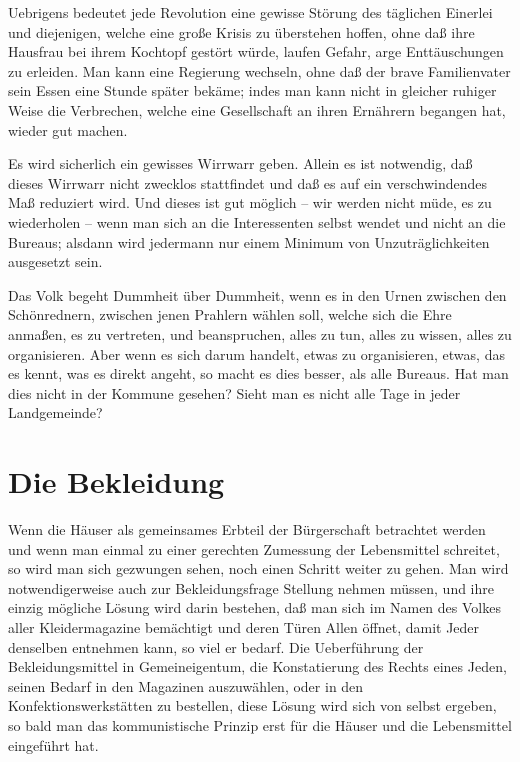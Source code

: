 \documentclass{scrbook}
\begin{document}
Uebrigens bedeutet jede Revolution eine gewisse Störung des täglichen Einerlei und diejenigen, welche eine große Krisis zu überstehen hoffen, ohne daß ihre Hausfrau bei ihrem Kochtopf gestört würde, laufen Gefahr, arge Enttäuschungen zu erleiden. Man kann eine Regierung wechseln, ohne daß der brave Familienvater sein Essen eine Stunde später bekäme; indes man kann nicht in gleicher ruhiger Weise die Verbrechen, welche eine Gesellschaft an ihren Ernährern begangen hat, wieder gut machen.

Es wird sicherlich ein gewisses Wirrwarr geben. Allein es ist notwendig, daß dieses Wirrwarr nicht zwecklos stattfindet und daß es auf ein verschwindendes Maß reduziert wird. Und dieses ist gut möglich – wir werden nicht müde, es zu wiederholen – wenn man sich an die Interessenten selbst wendet und nicht an die Bureaus; alsdann wird jedermann nur einem Minimum von Unzuträglichkeiten ausgesetzt sein.

Das Volk begeht Dummheit über Dummheit, wenn es in den Urnen zwischen den Schönrednern, zwischen jenen Prahlern wählen soll, welche sich die Ehre anmaßen, es zu vertreten, und beanspruchen, alles zu tun, alles zu wissen, alles zu organisieren. Aber wenn es sich darum handelt, etwas zu organisieren, etwas, das es kennt, was es direkt angeht, so macht es dies besser, als alle Bureaus. Hat man dies nicht in der Kommune gesehen? Sieht man es nicht alle Tage in jeder Landgemeinde?

\chapter{Die Bekleidung}

Wenn die Häuser als gemeinsames Erbteil der Bürgerschaft betrachtet werden und wenn man einmal zu einer gerechten Zumessung der Lebensmittel schreitet, so wird man sich gezwungen sehen, noch einen Schritt weiter zu gehen. Man wird notwendigerweise auch zur Bekleidungsfrage Stellung nehmen müssen, und ihre einzig mögliche Lösung wird darin bestehen, daß man sich im Namen des Volkes aller Kleidermagazine bemächtigt und deren Türen Allen öffnet, damit Jeder denselben entnehmen kann, so viel er bedarf. Die Ueberführung der Bekleidungsmittel in Gemeineigentum, die Konstatierung des Rechts eines Jeden, seinen Bedarf in den Magazinen auszuwählen, oder in den Konfektionswerkstätten zu bestellen, diese Lösung wird sich von selbst ergeben, so bald man das kommunistische Prinzip erst für die Häuser und die Lebensmittel eingeführt hat.
\end{document}
